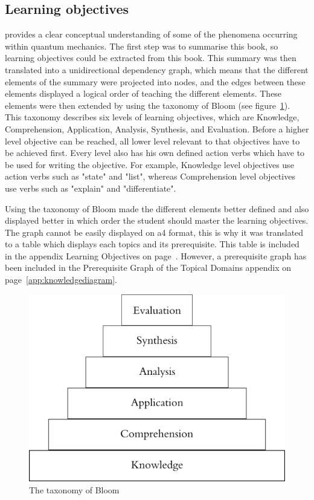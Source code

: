 \documentclass[11pt,twoside]{report} %
\begin{document}
\subsection{Learning objectives}

 provides a clear conceptual understanding of some of the phenomena occurring within quantum mechanics. The first step was to summarise this book, so learning objectives could be extracted from this book. This summary was then translated into a unidirectional dependency graph, which means that the different elements of the summary were projected into nodes, and the edges between these elements displayed a logical order of teaching the different elements. These elements were then extended by using the taxonomy of Bloom \cite{bloom} (see figure~\ref{fig:bloom}). This taxonomy describes six levels of learning objectives, which are Knowledge, Comprehension, Application, Analysis, Synthesis, and Evaluation. Before a higher level objective can be reached, all lower level relevant to that objectives have to be achieved first. Every level also has his own defined action verbs which have to be used for writing the objective. For example, Knowledge level objectives use action verbs such as "state" and "list", whereas Comprehension level objectives use verbs such as "explain" and "differentiate".

Using the taxonomy of Bloom made the different elements better defined and also displayed better in which order the student should master the learning objectives. The graph cannot be easily displayed on a4 format, this is why it was translated to a table which displays each topics and its prerequisite. This table is included in the appendix Learning Objectives on page~\pageref{app:learningobjectives}. However, a prerequisite graph has been included in the Prerequisite Graph of the Topical Domains appendix on page~\ref{app:knowledgediagram}.

\begin{figure}[h]
\centering
\includegraphics[width=.4\textwidth]{bloom}
\caption{The taxonomy of Bloom \protect\cite{bloom}\label{fig:bloom}}
\end{figure}
\end{document}
